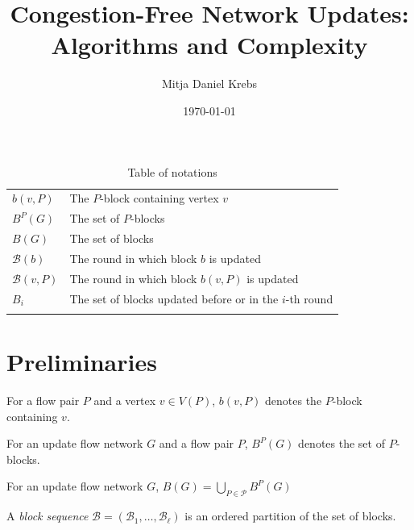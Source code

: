 \documentclass[fontsize=11pt,paper=a4]{book}
\author{Mitja Daniel Krebs}
\date{\today}
\title{Congestion-Free Network Updates: Algorithms and Complexity}
\begin{document}
\maketitle
\tableofcontents

\begin{table}[htbp]
\caption{Table of notations}
\centering
\begin{tabular}{ll}
\hyperref[org999ae9c]{\(b(v,P)\)} & The \(P\)-block containing vertex \(v\)\\[0pt]
\hyperref[org00a7a1f]{\(B^P(G)\)} & The set of \(P\)-blocks\\[0pt]
\hyperref[orgf362631]{\(B(G)\)} & The set of blocks\\[0pt]
\hyperref[orge2d4dec]{\(\mathcal{B}(b)\)} & The round in which block \(b\) is updated\\[0pt]
\hyperref[orgb2a96fb]{\(\mathcal{B}(v,P)\)} & The round in which block \(b(v,P)\) is updated\\[0pt]
\hyperref[orga242d7e]{\(B_i\)} & The set of blocks updated before or in the \(i\)-th round\\[0pt]
 & \\[0pt]
\end{tabular}
\end{table}

\part{Preliminaries}
\label{sec:org408641c}

\begin{notation}
For a flow pair \(P\) and a vertex \(v\in V(P)\), \(b(v,P)\) denotes the \(P\)-block containing \(v\).
\label{org999ae9c}
\end{notation}

\begin{notation}
For an update flow network \(G\) and a flow pair \(P\), \(B^P(G)\) denotes the set of \(P\)-blocks.
\label{org00a7a1f}
\end{notation}

\begin{notation}
For an update flow network \(G\), \(B(G)=\bigcup_{P\in\mathcal{P}}B^P(G)\)
\label{orgf362631}
\end{notation}

\begin{defn}
A \emph{block sequence} \(\mathcal{B}=(\mathscr{B}_1,\dots,\mathscr{B}_{\ell})\) is an ordered partition of the set of blocks.
\label{orgced51d4}
\end{defn}
\end{document}
